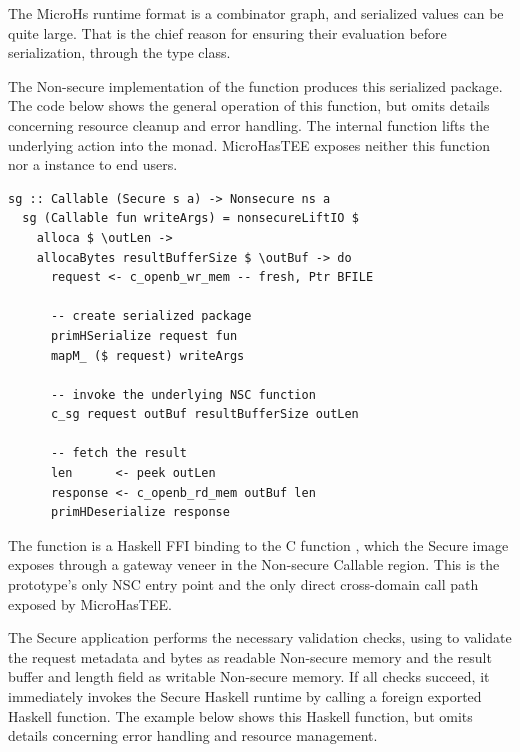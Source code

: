 \documentclass[sigconf]{acmart}
\begin{document}
The MicroHs runtime format is a combinator graph, and serialized values can be quite large.
That is the chief reason for ensuring their evaluation before serialization, through the  type class.

The Non-secure implementation of the function  produces this serialized package.
The code below shows the general operation of this function, but omits details concerning resource cleanup and error handling.
The internal function  lifts the underlying  action into the  monad.
MicroHasTEE exposes neither this function nor a  instance to end users.

\begin{lstlisting}[style=haskell]
  sg :: Callable (Secure s a) -> Nonsecure ns a
  sg (Callable fun writeArgs) = nonsecureLiftIO $
    alloca $ \outLen ->
    allocaBytes resultBufferSize $ \outBuf -> do
      request <- c_openb_wr_mem -- fresh, Ptr BFILE
  
      -- create serialized package
      primHSerialize request fun
      mapM_ ($ request) writeArgs
  
      -- invoke the underlying NSC function
      c_sg request outBuf resultBufferSize outLen
  
      -- fetch the result
      len      <- peek outLen
      response <- c_openb_rd_mem outBuf len
      primHDeserialize response
\end{lstlisting}

The function  is a Haskell FFI binding to the C function , which the Secure image exposes through a gateway veneer in the Non-secure Callable region.
This is the prototype's only NSC entry point and the only direct cross-domain call path exposed by MicroHasTEE.

The Secure application performs the necessary validation checks, using  to validate the request metadata and bytes as readable Non-secure memory and the result buffer and length field as writable Non-secure memory.
If all checks succeed, it immediately invokes the Secure Haskell runtime by calling a foreign exported Haskell function.
The example below shows this Haskell function, but omits details concerning error handling and resource management.
\end{document}
